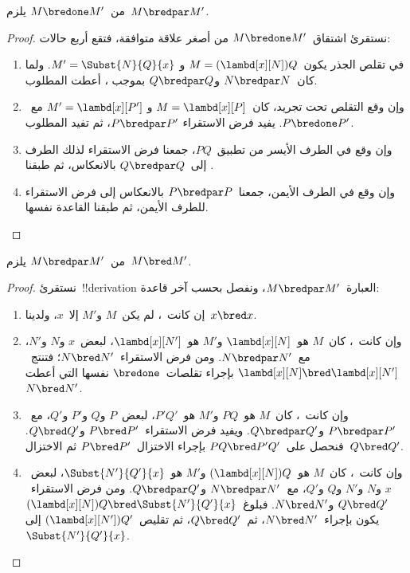 \documentclass[../../../include/open-logic-section]{subfiles}
\begin{document}


\begin{lem}
  من~$M \bredone M'$ يلزم~$M \bredpar M'$.
\end{lem}
\begin{proof}
  نستقرئ اشتقاق~$M \bredone M'$ من أصغر علاقة متوافقة، فتقع أربع حالات:
  \begin{enumerate}
  \item في تقلص الجذر يكون~$M=(\lambd[x][N])Q$ و
    $M'=\Subst{N}{Q}{x}$. ولما كان~$N\bredpar N$ و$Q\bredpar Q$
    بموجب ، أعطت
     المطلوب.
  \item وإن وقع التقلص تحت تجريد، كان~$M=\lambd[x][P]$ و
    $M'=\lambd[x][P']$ مع~$P\bredone P'$. يفيد فرض الاستقراء
    $P\bredpar P'$، ثم تفيد  المطلوب.
  \item وإن وقع في الطرف الأيسر من تطبيق~$PQ$، جمعنا فرض
    الاستقراء لذلك الطرف إلى~$Q\bredpar Q$ بالانعكاس، ثم طبقنا
    .
  \item وإن وقع في الطرف الأيمن، جمعنا~$P\bredpar P$ بالانعكاس
    إلى فرض الاستقراء للطرف الأيمن، ثم طبقنا القاعدة نفسها.
  \end{enumerate}
\end{proof}

\begin{lem}
  من~$M \bredpar M'$ يلزم~$M \bred M'$.
\end{lem}

\begin{proof}
  نستقرئ~!!{derivation} العبارة~$M \bredpar M'$، ونفصل بحسب آخر قاعدة:
  \begin{enumerate}
  \item إن كانت~، لم يكن~$M$ و$M'$ إلا~$x$،
    ولدينا~$x \bred x$.
  \item وإن كانت~، كان~$M$ هو~$\lambd[x][N]$
    و$M'$ هو~$\lambd[x][N']$، لبعض~$x$ و$N$ و$N'$، مع~$N \bredpar N'$.
    ومن فرض الاستقراء~$N \bred N'$؛ فتنتج~$\lambd[x][N] \bred \lambd[x][N']$
    بإجراء تقلصات~$\bredone$ نفسها التي أعطت~$N \bred N'$.
  \item وإن كانت~، كان~$M$ هو~$PQ$ و$M'$ هو~$P'Q'$،
    لبعض~$P$ و$Q$ و$P'$ و$Q'$، مع~$P \bredpar P'$ و$Q \bredpar Q'$.
    ويفيد فرض الاستقراء~$P \bred P'$ و$Q \bred Q'$.
    فنحصل على~$PQ \bred P'Q'$ بإجراء الاختزال~$P \bred P'$
    ثم الاختزال~$Q \bred Q'$.
  \item وإن كانت~، كان~$M$ هو~$(\lambd[x][N])Q$
    و$M'$ هو~$\Subst{N'}{Q'}{x}$، لبعض~$x$ و$N$ و$N'$ و$Q$ و$Q'$،
    مع~$N \bredpar N'$ و$Q \bredpar Q'$.
    ومن فرض الاستقراء~$Q \bred Q'$ و$N \bred N'$.
    فبلوغ~$(\lambd[x][N])Q \bred \Subst{N'}{Q'}{x}$
    يكون بإجراء~$N \bred N'$، ثم~$Q \bred Q'$،
    ثم تقليص~$(\lambd[x][N'])Q'$ إلى~$\Subst{N'}{Q'}{x}$.
  \end{enumerate}
\end{proof}
\end{document}
